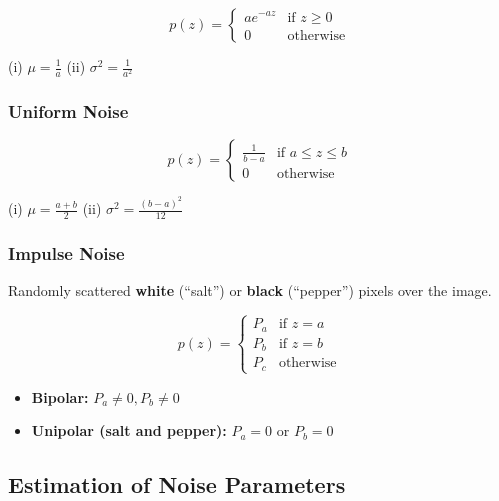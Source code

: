 \begin{equation*}
  p(z) =
  \begin{cases}
    ae^{-az} & \text{if } z \geq 0 \\
    0 & \text{otherwise}
  \end{cases}
\end{equation*}

(i) $\mu = \frac{1}{a}$ (ii) $\sigma^2 = \frac{1}{a^2}$

\subsubsection*{Uniform Noise}

\begin{equation*}
  p(z) =
  \begin{cases}
    \frac{1}{b-a} & \text{if } a \leq z \leq b \\
    0 & \text{otherwise}
  \end{cases}
\end{equation*}

(i) $\mu = \frac{a + b}{2}$ (ii) $\sigma^2 = \frac{(b - a)^2}{12}$

\subsubsection*{Impulse Noise}

Randomly scattered \textbf{white} (\enquote{salt}) or \textbf{black}
(\enquote{pepper}) pixels over the image.

\begin{equation*}
  p(z) =
  \begin{cases}
    P_a & \text{if } z = a \\
    P_b & \text{if } z = b \\
    P_c & \text{otherwise}
  \end{cases}
\end{equation*}

\begin{itemize}
  \item \textbf{Bipolar:} $P_a \neq 0, P_b \neq 0$
  \item \textbf{Unipolar (salt and pepper):} $P_a = 0$ or $P_b = 0$
\end{itemize}

\subsection*{Estimation of Noise Parameters}

